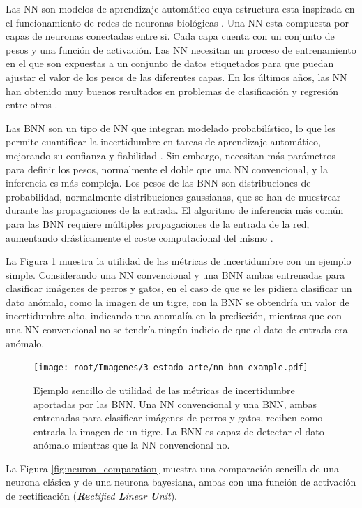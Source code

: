 Las NN son modelos de aprendizaje automático cuya estructura esta inspirada en el funcionamiento de redes de neuronas biológicas \cite{deep_learning_nature}. Una NN esta compuesta por capas de neuronas conectadas entre si. Cada capa cuenta con un conjunto de pesos y una función de activación. Las NN necesitan un proceso de entrenamiento en el que son expuestas a un conjunto de datos etiquetados para que puedan ajustar el valor de los pesos de las diferentes capas. En los últimos años, las NN han obtenido muy buenos resultados en problemas de clasificación y regresión entre otros \cite{cnn_image_survey}.

Las BNN son un tipo de NN que integran modelado probabilístico, lo que les permite cuantificar la incertidumbre en tareas de aprendizaje automático, mejorando su confianza y fiabilidad \cite{bnn_hyper_uncertainty}. Sin embargo, necesitan más parámetros para definir los pesos, normalmente el doble que una NN convencional, y la inferencia es más compleja. Los pesos de las BNN son distribuciones de probabilidad, normalmente distribuciones gaussianas, que se han de muestrear durante las propagaciones de la entrada. El algoritmo de inferencia más común para las BNN requiere múltiples propagaciones de la entrada de la red, aumentando drásticamente el coste computacional del mismo \cite{bnn_theory_paper}. 

La Figura \ref{fig:bnn_vs_nn_example} muestra la utilidad de las métricas de incertidumbre con un ejemplo simple. Considerando una NN convencional y una BNN ambas entrenadas para clasificar imágenes de perros y gatos, en el caso de que se les pidiera clasificar un dato anómalo, como la imagen de un tigre, con la BNN se obtendría un valor de incertidumbre alto, indicando una anomalía en la predicción, mientras que con una NN convencional no se tendría ningún indicio de que el dato de entrada era anómalo.

\begin{figure}[h]
    \centering
    \texttt{[image: root/Imagenes/3\_estado\_arte/nn\_bnn\_example.pdf]}
    \caption{Ejemplo sencillo de utilidad de las métricas de incertidumbre aportadas por las BNN. Una NN convencional y una BNN, ambas entrenadas para clasificar imágenes de perros y gatos, reciben como entrada la imagen de un tigre. La BNN es capaz de detectar el dato anómalo mientras que la NN convencional no.}
    \label{fig:bnn_vs_nn_example}
\end{figure}

La Figura \ref{fig:neuron_comparation} muestra una comparación sencilla de una neurona clásica y de una neurona bayesiana, ambas con una función de activación de rectificación (\textit{\textbf{Re}ctified \textbf{L}inear \textbf{U}nit}).

